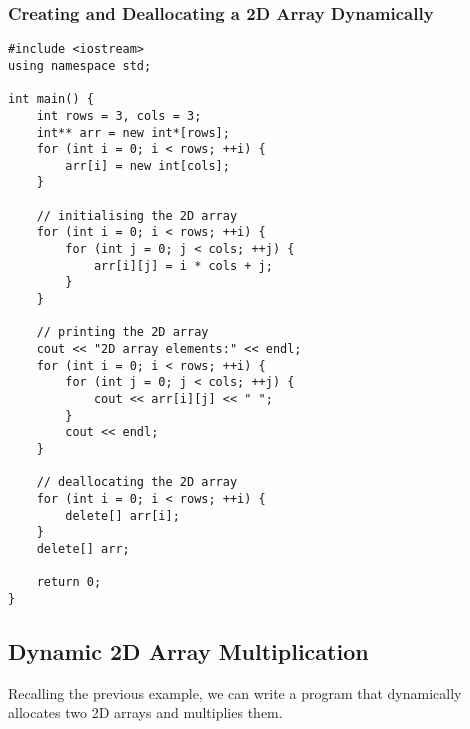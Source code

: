 \documentclass{article}
\begin{document}
\subsubsection*{Creating and Deallocating a 2D Array Dynamically}

\begin{verbatim}
#include <iostream>
using namespace std;

int main() {
    int rows = 3, cols = 3;
    int** arr = new int*[rows];
    for (int i = 0; i < rows; ++i) {
        arr[i] = new int[cols];
    }

    // initialising the 2D array
    for (int i = 0; i < rows; ++i) {
        for (int j = 0; j < cols; ++j) {
            arr[i][j] = i * cols + j;
        }
    }

    // printing the 2D array
    cout << "2D array elements:" << endl;
    for (int i = 0; i < rows; ++i) {
        for (int j = 0; j < cols; ++j) {
            cout << arr[i][j] << " ";
        }
        cout << endl;
    }

    // deallocating the 2D array
    for (int i = 0; i < rows; ++i) {
        delete[] arr[i];
    }
    delete[] arr;

    return 0;
}
\end{verbatim}


\subsection*{Dynamic 2D Array Multiplication}
Recalling the previous example, we can write a program that dynamically allocates two 2D arrays and multiplies them.
\end{document}

